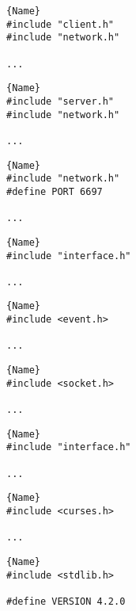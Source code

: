\documentclass[a4paper,12pt]{article}
\begin{document}
\begin{minipage}{.3\textwidth}
\begin{lstlisting}[caption=client.c,frame=tlrb]{Name}
#include "client.h"
#include "network.h"

...
\end{lstlisting}
\end{minipage}\hfill
\begin{minipage}{.3\textwidth}
\begin{lstlisting}[caption=server.c,frame=tlrb]{Name}
#include "server.h"
#include "network.h"

...
\end{lstlisting}
\end{minipage}\hfill
\begin{minipage}{.3\textwidth}
\begin{lstlisting}[caption=network.c,frame=tlrb]{Name}
#include "network.h"
#define PORT 6697

...
\end{lstlisting}
\end{minipage}

\begin{minipage}{.3\textwidth}
\begin{lstlisting}[caption=client.h,frame=tlrb]{Name}
#include "interface.h"

...
\end{lstlisting}
\end{minipage}\hfill
\begin{minipage}{.3\textwidth}
\begin{lstlisting}[caption=server.h,frame=tlrb]{Name}
#include <event.h>

...
\end{lstlisting}
\end{minipage}\hfill
\begin{minipage}{.3\textwidth}
\begin{lstlisting}[caption=network.h,frame=tlrb]{Name}
#include <socket.h>

...
\end{lstlisting}
\end{minipage}

\begin{minipage}{.3\textwidth}
\begin{lstlisting}[caption=interface.c,frame=tlrb]{Name}
#include "interface.h"

...
\end{lstlisting}
\end{minipage}\hfill
\begin{minipage}{.3\textwidth}
\begin{lstlisting}[caption=interface.h,frame=tlrb]{Name}
#include <curses.h>

...
\end{lstlisting}
\end{minipage}\hfill
\begin{minipage}{.3\textwidth}
\begin{lstlisting}[caption=common.h,frame=tlrb]{Name}
#include <stdlib.h>

#define VERSION 4.2.0
\end{lstlisting}
\end{minipage}
\end{document}
